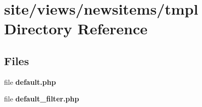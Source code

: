 \section{site/views/newsitems/tmpl Directory Reference}
\label{dir_3d8e50e71bd2e0f446419c20c2f644ca}
\subsection*{Files}
\begin{DoxyCompactItemize}
\item 
file \textbf{ default.\+php}
\item 
file \textbf{ default\+\_\+filter.\+php}
\end{DoxyCompactItemize}
